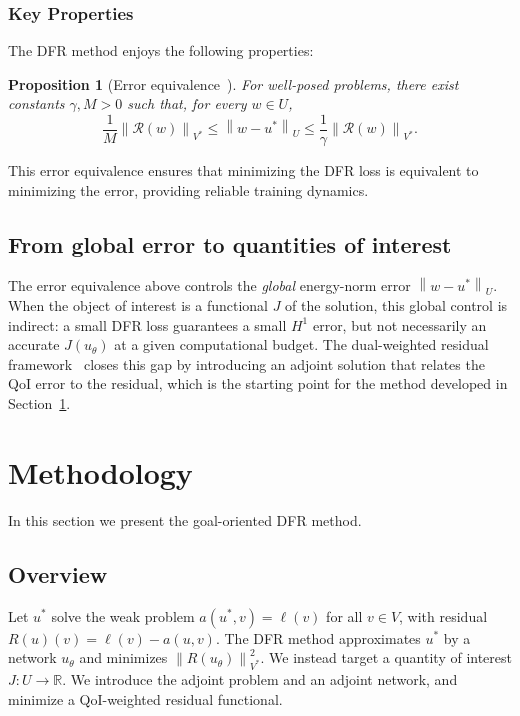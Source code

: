\documentclass[preprint,11pt]{elsarticle}
\newtheorem{proposition}[theorem]{Proposition}
\newcommand{\R}{\mathbb{R}}
\newcommand{\norm}[1]{\left\|#1\right\|}
\begin{document}
\subsubsection{Key Properties}

The DFR method enjoys the following properties:
\begin{proposition}[Error equivalence~\citep{taylor2023deep}]
    For well-posed problems, there exist constants $\gamma, M > 0$ such that, for every $w \in U$,
    \begin{equation}
        \frac{1}{M}\norm{\mathcal{R}(w)}_{V^*} \leq \norm{w - u^*}_{U} \leq \frac{1}{\gamma}\norm{\mathcal{R}(w)}_{V^*}.
    \end{equation}
\end{proposition}

This error equivalence ensures that minimizing the DFR loss is equivalent to minimizing the error, providing reliable training dynamics.

\subsection{From global error to quantities of interest}

The error equivalence above controls the \emph{global} energy-norm error $\norm{w - u^*}_U$. When the object of interest is a functional $J$ of the solution, this global control is indirect: a small DFR loss guarantees a small $H^1$ error, but not necessarily an accurate $J(u_\theta)$ at a given computational budget. The dual-weighted residual framework~\citep{becker2001optimal} closes this gap by introducing an adjoint solution that relates the QoI error to the residual, which is the starting point for the method developed in Section~\ref{sec:methodology}.

\section{Methodology}
\label{sec:methodology}

In this section we present the goal-oriented DFR method.

\subsection{Overview}

Let $u^*$ solve the weak problem $a(u^*, v) = \ell(v)$ for all $v \in V$, with residual $R(u)(v) = \ell(v) - a(u, v)$. The DFR method approximates $u^*$ by a network $u_\theta$ and minimizes $\norm{R(u_\theta)}_{V^*}^2$. We instead target a quantity of interest $J: U \to \R$. We introduce the adjoint problem and an adjoint network, and minimize a QoI-weighted residual functional.
\end{document}

